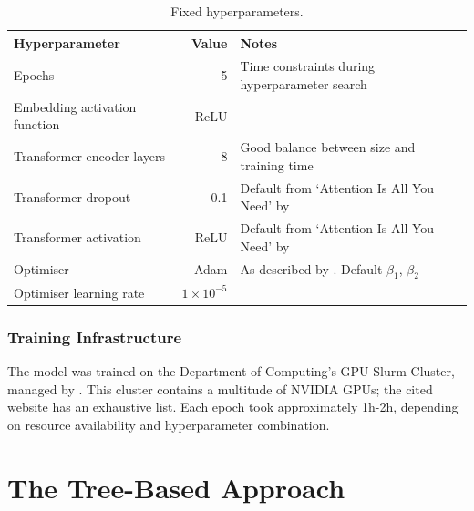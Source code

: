 \begin{table}[H]
  \centering
  \begin{adjustbox}{width=\textwidth}
    \begin{tabular}{l|rl}

      Hyperparameter & Value & Notes \\
      \hline

      Epochs & 5 & Time constraints during hyperparameter search \\

      Embedding activation function & ReLU & \\

      Transformer encoder layers & 8 & Good balance between size and training
      time \\

      Transformer dropout & 0.1 & Default from `Attention Is All You Need' by
      \citet{attention}\\

      Transformer activation & ReLU & Default from `Attention Is All You Need'
      by \citet{attention} \\

      Optimiser & Adam & As described by \citet{kingma2014adam}. Default
      $\beta_1$, $\beta_2$ \\

      Optimiser learning rate & $1\times10^{-5}$ &

    \end{tabular}
  \end{adjustbox}
  \caption{Fixed hyperparameters.}
  \label{tabFixedparam}
\end{table}

\subsection{Training Infrastructure}\label{mlS23}

The model was trained on the Department of Computing's GPU Slurm Cluster,
managed by \citet{csgGPU}. This cluster contains a multitude of NVIDIA GPUs;
the cited website has an exhaustive list. Each epoch took approximately 1h-2h,
depending on resource availability and hyperparameter combination.

\chapter{The Tree-Based Approach}\label{treeChapter}

